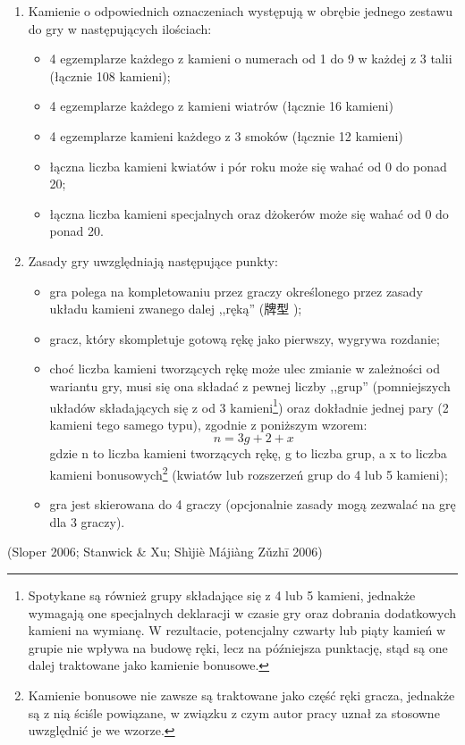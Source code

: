 \begin{enumerate}[label={\alph*)}]
\begin{itemize}
	\end{itemize}
\item Kamienie o odpowiednich oznaczeniach występują w obrębie jednego zestawu
do gry w następujących ilościach:
	\begin{itemize}
	  \item 4 egzemplarze każdego z kamieni o numerach od 1 do 9 w każdej z 3 talii
	  (łącznie 108 kamieni);
	  \item 4 egzemplarze każdego z kamieni wiatrów (łącznie 16 kamieni)
	  \item 4 egzemplarze kamieni każdego z 3 smoków (łącznie 12 kamieni)
	  \item łączna liczba kamieni kwiatów i pór roku może się wahać od 0 do ponad
	  20;
	  \item łączna liczba kamieni specjalnych oraz dżokerów może się wahać od
	0 do ponad 20.
	\end{itemize} 
\item Zasady gry uwzględniają następujące punkty:
	\begin{itemize}
	  \item gra polega na kompletowaniu przez graczy określonego przez zasady
	  układu kamieni zwanego dalej ,,ręką'' (牌型 );
	  \item gracz, który skompletuje gotową rękę jako pierwszy, wygrywa rozdanie;
	  \item choć liczba kamieni tworzących rękę może ulec zmianie w zależności od
	  wariantu gry, musi się ona składać z pewnej liczby ,,grup'' (pomniejszych
	  układów składających się z od 3 kamieni\footnote{Spotykane są również grupy
	  składające się z 4 lub 5 kamieni, jednakże wymagają one specjalnych
	  deklaracji w czasie gry oraz dobrania dodatkowych kamieni na wymianę. W
	  rezultacie, potencjalny czwarty lub piąty kamień w grupie nie wpływa na
	  budowę ręki, lecz na późniejsza punktację, stąd są one dalej traktowane
	  jako kamienie bonusowe.}) oraz dokładnie jednej pary (2 kamieni tego samego
	  typu), zgodnie z poniższym wzorem:
	  \begin{equation*}
	  n = 3g + 2 + x
	  \end{equation*}
	  gdzie n to liczba kamieni tworzących rękę, g to liczba grup, a x to liczba
	  kamieni bonusowych\footnote{Kamienie bonusowe nie zawsze są traktowane jako
	  część ręki gracza, jednakże są z nią ściśle powiązane, w związku z czym
	  autor pracy uznał za stosowne uwzględnić je we wzorze.} (kwiatów lub
	  rozszerzeń grup do 4 lub 5 kamieni);
	  \item gra jest skierowana do 4 graczy (opcjonalnie zasady mogą
	  zezwalać na grę dla 3 graczy).
	\end{itemize} 
\end{enumerate}
(Sloper 2006; Stanwick \& Xu; Shìjiè Májiàng Zǔzhī 2006)
